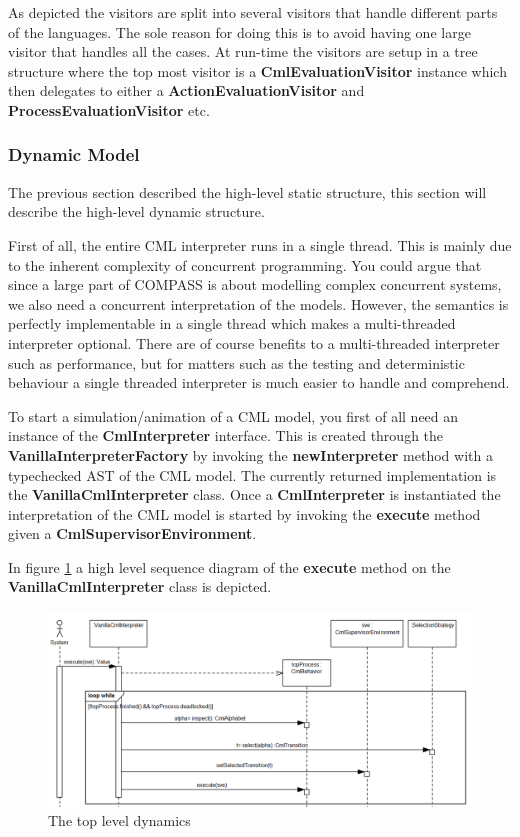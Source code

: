 \documentclass[a4paper, 10pt]{include/compassreport}   %
\begin{document}
As depicted the visitors are split into several visitors that handle
different parts of the languages. The sole reason for doing this is to
avoid having one large visitor that handles all the cases. At run-time
the visitors are setup in a tree structure where the top most visitor
is a \textbf{CmlEvaluationVisitor} instance which then delegates to
either a \textbf{ActionEvaluationVisitor} and
\textbf{ProcessEvaluationVisitor} etc.


\subsubsection{Dynamic Model}
\label{sec:dynamic_structure}

The previous section described the high-level static structure, this
section will describe the high-level dynamic structure.

First of all, the entire CML interpreter runs in a single thread. This
is mainly due to the inherent complexity of concurrent
programming. You could argue that since a large part of COMPASS is
about modelling complex concurrent systems, we also need a concurrent
interpretation of the models. However, the semantics is perfectly
implementable in a single thread which makes a multi-threaded
interpreter optional. There are of course benefits to a multi-threaded
interpreter such as performance, but for matters such as the testing
and deterministic behaviour a single threaded interpreter is much
easier to handle and comprehend.

To start a simulation/animation of a CML model, you first of all need
an instance of the \textbf{CmlInterpreter} interface. This is created
through the \textbf{VanillaInterpreterFactory} by invoking the
\textbf{newInterpreter} method with a typechecked AST of the CML
model. The currently returned implementation is the
\textbf{VanillaCmlInterpreter} class. Once a \textbf{CmlInterpreter}
is instantiated the interpretation of the CML model is started
by invoking the \textbf{execute} method given a
\textbf{CmlSupervisorEnvironment}.

In figure \ref{fig:dynamic_toplevel} a high level sequence diagram of
the \textbf{execute} method on the \textbf{VanillaCmlInterpreter}
class is depicted. 

\begin{figure}[ht!]
  \begin{center}
    \includegraphics[width=1\textwidth]{figures/DynamicTopLevel}
    \caption{The top level dynamics}
    \label{fig:dynamic_toplevel}
  \end{center}
\end{figure}
\end{document}

